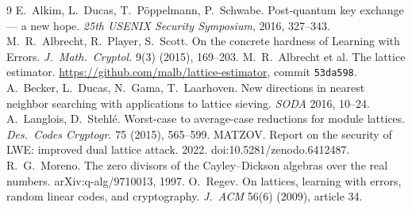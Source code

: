 \documentclass[11pt]{article}
\theoremstyle{remark}
\begin{document}
\begin{thebibliography}{9}\small
{} E.~Alkim, L.~Ducas, T.~P\"oppelmann, P.~Schwabe. Post-quantum key exchange --- a new hope.
  \emph{25th USENIX Security Symposium}, 2016, 327--343.
 M.~R.~Albrecht, R.~Player, S.~Scott. On the concrete hardness of Learning with Errors.
  \emph{J.\ Math.\ Cryptol.} 9(3) (2015), 169--203.
 M.~R.~Albrecht et al. The lattice estimator.
  \url{https://github.com/malb/lattice-estimator}, commit \texttt{53da598}.
 A.~Becker, L.~Ducas, N.~Gama, T.~Laarhoven. New directions in nearest neighbor searching with
  applications to lattice sieving. \emph{SODA} 2016, 10--24.
 A.~Langlois, D.~Stehl\'e. Worst-case to average-case reductions for module lattices.
  \emph{Des.\ Codes Cryptogr.} 75 (2015), 565--599.
 MATZOV. Report on the security of LWE: improved dual lattice attack. 2022.
  doi:10.5281/zenodo.6412487.
 R.~G.~Moreno. The zero divisors of the Cayley--Dickson algebras over the real numbers.
  arXiv:q-alg/9710013, 1997.
 O.~Regev. On lattices, learning with errors, random linear codes, and cryptography.
  \emph{J.\ ACM} 56(6) (2009), article 34.
\end{thebibliography}
\end{document}
